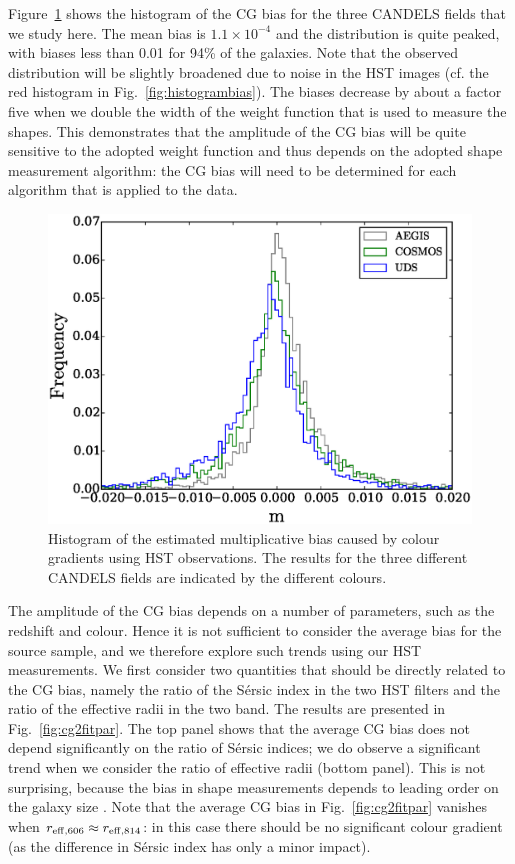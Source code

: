 \documentclass[useAMS,usenatbib]{mnras}
\begin{document}
Figure~\ref{fig:cgbhis} shows the histogram of the CG bias for the three CANDELS fields that we study here. The mean bias is $1.1\times 10^{-4}$ and the distribution is quite peaked, with biases less than 0.01 for 
94\% of the galaxies. Note that the observed distribution will be slightly broadened due to noise in the HST images (cf. the red histogram in Fig.~\ref{fig:histogrambias}). The biases decrease by about a factor five when we double the width of the weight function that is used to measure the shapes. This demonstrates that the amplitude of the CG bias will be quite sensitive to the adopted weight function and thus depends on the adopted shape measurement algorithm: the CG bias will need to be determined for each algorithm that is applied to the data.

%
\begin{figure}
  \includegraphics[width=\hsize]{zhiscgb.eps}
\caption{Histogram of the estimated multiplicative bias caused by colour gradients using HST 
observations. The results for the three different CANDELS fields are indicated by the different
colours.}
\label{fig:cgbhis}
\end{figure}

The amplitude of the CG bias depends on a number of parameters, such as the redshift and colour. Hence it is not sufficient to consider the average bias for the source sample, and we therefore explore such trends using our HST measurements. We first consider two quantities that should be directly related to 
the CG bias, namely the ratio of the S{\'e}rsic index in the two HST filters and the ratio of the effective
radii in the two band. The results are presented in Fig.~\ref{fig:cg2fitpar}. The top panel shows that the
average CG bias does not depend significantly on the ratio of S{\'e}rsic indices; we do observe a significant trend when we consider the ratio of effective radii (bottom panel). This is not surprising, because the bias in shape measurements depends to leading order on the galaxy size \citep{Massey13}. Note that the average CG bias in Fig.~\ref{fig:cg2fitpar} vanishes  when $r_{\rm eff,606}\approx r_{\rm eff, 814}$: in this case there should be no significant colour gradient (as the difference in S{\'e}rsic index has only a minor impact).
\end{document}
